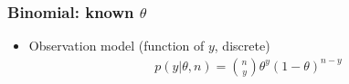 \documentclass[english,t]{beamer}
\begin{document}
\begin{frame}
  \frametitle{Binomial: known $\theta$}

  \begin{itemize}
  \item Observation model (function of $y$, discrete)
    \begin{align*}
      p(y|\theta,n) = \binom{n}{y} \theta^y(1-\theta)^{n-y}
    \end{align*}
  \end{itemize}

  \begin{center}
\end{center}
\end{frame}
\end{document}
